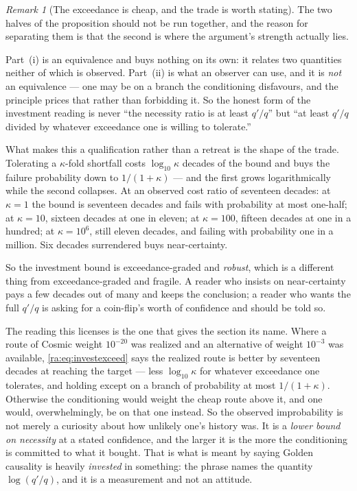 \documentclass[11pt]{article}
\numberwithin{equation}{section}
\theoremstyle{plain}
\theoremstyle{definition}
\theoremstyle{remark}
\newtheorem{remark}[theorem]{Remark}
\begin{document}
\begin{remark}[The exceedance is cheap, and the trade is worth stating]
\label{ra:rem:investkappa}
The two halves of the proposition should not be run together, and the
reason for separating them is that the second is where the argument's
strength actually lies.

Part~(i) is an equivalence and buys nothing on its own: it relates two
quantities neither of which is observed. Part~(ii) is what an observer
can use, and it is \emph{not} an equivalence --- one may be on a branch
the conditioning disfavours, and the principle prices that rather than
forbidding it. So the honest form of the investment reading is never
``the necessity ratio is at least $q'/q$'' but ``at least $q'/q$ divided
by whatever exceedance one is willing to tolerate.''

What makes this a qualification rather than a retreat is the shape of the
trade. Tolerating a $\kappa$-fold shortfall costs $\log_{10}\kappa$
decades of the bound and buys the failure probability down to
$1/(1+\kappa)$ --- and the first grows logarithmically while the second
collapses. At an observed cost ratio of seventeen decades: at
$\kappa=1$ the bound is seventeen decades and fails with probability at
most one-half; at $\kappa=10$, sixteen decades at one in eleven; at
$\kappa=100$, fifteen decades at one in a hundred; at $\kappa=10^{6}$,
still eleven decades, and failing with probability one in a million. Six
decades surrendered buys near-certainty.

So the investment bound is exceedance-graded and \emph{robust}, which is
a different thing from exceedance-graded and fragile. A reader who
insists on near-certainty pays a few decades out of many and keeps the
conclusion; a reader who wants the full $q'/q$ is asking for a
coin-flip's worth of confidence and should be told so.
\end{remark}

The reading this licenses is the one that gives the section its name.
Where a route of Cosmic weight $10^{-20}$ was realized and an alternative
of weight $10^{-3}$ was available, \eqref{ra:eq:investexceed} says the
realized route is better by seventeen decades at reaching the target ---
less $\log_{10}\kappa$ for whatever exceedance one tolerates, and holding
except on a branch of probability at most $1/(1+\kappa)$. Otherwise the
conditioning would weight the cheap route above it, and one would,
overwhelmingly, be on that one instead. So the observed
improbability is not merely a curiosity about how unlikely one's history
was. It is a \emph{lower bound on necessity} at a stated confidence, and the
larger it is the more the conditioning is committed to what it bought. That is what is
meant by saying Golden causality is heavily \emph{invested} in something:
the phrase names the quantity $\log(q'/q)$, and it is a measurement and
not an attitude.
\end{document}
